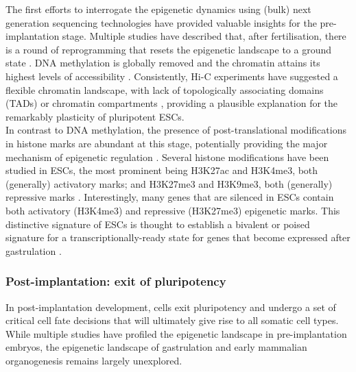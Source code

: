 The first efforts to interrogate the epigenetic dynamics using (bulk) next generation sequencing technologies have provided valuable insights for the pre-implantation stage. Multiple studies have described that, after fertilisation, there is a round of reprogramming that resets the epigenetic landscape to a ground state \cite{Smith2012,Lee2014}. DNA methylation is globally removed and the chromatin attains its highest levels of accessibility \cite{Wu2016}. Consistently, Hi-C experiments have suggested a flexible chromatin landscape, with lack of topologically associating domains (TADs) or chromatin compartments \cite{Ke2017,Du2017,Tee2014}, providing a plausible explanation for the remarkably plasticity of pluripotent ESCs.\\
In contrast to DNA methylation, the presence of post-translational modifications in histone marks are abundant at this stage, potentially providing the major mechanism of epigenetic regulation \cite{Hanna2018,Tee2014}. Several histone modifications have been studied in ESCs, the most prominent being H3K27ac and H3K4me3, both (generally) activatory marks; and H3K27me3 and H3K9me3, both (generally) repressive marks \cite{Zhao2015}. Interestingly, many genes that are silenced in ESCs contain both activatory (H3K4me3) and repressive (H3K27me3) epigenetic marks. This distinctive signature of ESCs is thought to establish a bivalent or poised signature for a transcriptionally-ready state for genes that become expressed after gastrulation \cite{Bernstein2006,Tee2014}. 

\subsubsection{Post-implantation: exit of pluripotency}

In post-implantation development, cells exit pluripotency and undergo a set of critical cell fate decisions that will ultimately give rise to all somatic cell types. While multiple studies have profiled the epigenetic landscape in pre-implantation embryos, the epigenetic landscape of gastrulation and early mammalian organogenesis remains largely unexplored.


